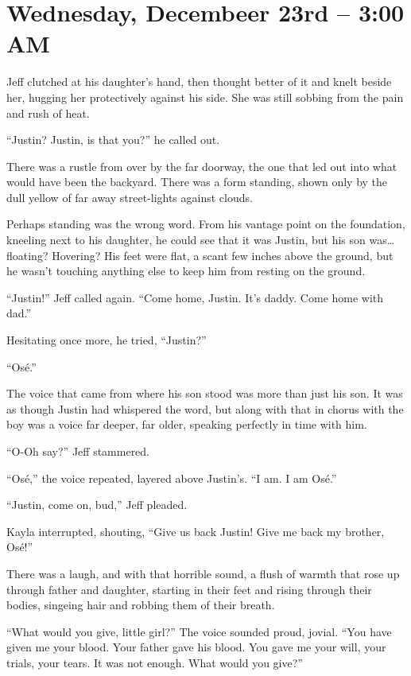 \chapter{Wednesday, Decembeer 23rd -- 3:00 AM}

Jeff clutched at his daughter's hand, then thought better of it and knelt beside her, hugging her protectively against his side.  She was still sobbing from the pain and rush of heat.

``Justin?  Justin, is that you?'' he called out.

There was a rustle from over by the far doorway, the one that led out into what would have been the backyard.  There was a form standing, shown only by the dull yellow of far away street-lights against clouds.

Perhaps standing was the wrong word.  From his vantage point on the foundation, kneeling next to his daughter, he could see that it was Justin, but his son was\ldots{}floating?  Hovering? His feet were flat, a scant few inches above the ground, but he wasn't touching anything else to keep him from resting on the ground.

``Justin!'' Jeff called again.  ``Come home, Justin.  It's daddy.  Come home with dad.''

Hesitating once more, he tried, ``Justin?''

``Os\'e.''

The voice that came from where his son stood was more than just his son.  It was as though Justin had whispered the word, but along with that in chorus with the boy was a voice far deeper, far older, speaking perfectly in time with him.

``O-Oh say?'' Jeff stammered.

``Os\'e,'' the voice repeated, layered above Justin's.  ``I am.  I am Os\'e.''

``Justin, come on, bud,'' Jeff pleaded.

Kayla interrupted, shouting, ``Give us back Justin!  Give me back my brother, Os\'e!''

There was a laugh, and with that horrible sound, a flush of warmth that rose up through father and daughter, starting in their feet and rising through their bodies, singeing hair and robbing them of their breath.

``What would you give, little girl?''  The voice sounded proud, jovial.  ``You have given me your blood.  Your father gave his blood.  You gave me your will, your trials, your tears.  It was not enough.  What would you give?''

